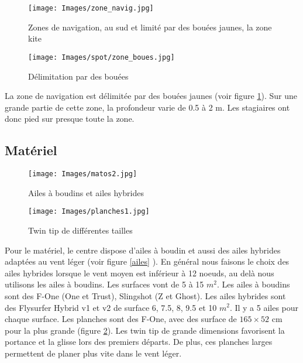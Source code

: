 \documentclass[11pt,a4paper]{report}
\begin{document}
%

\begin{figure}
\begin{minipage}{0.4\textwidth}
\texttt{[image: Images/zone\_navig.jpg]}
\caption{Zones de navigation, au sud et limité par des bouées jaunes,
la zone kite\label{zones_nav}} 
\end{minipage}
\hfill
\begin{minipage}{0.4\textwidth}
\texttt{[image: Images/spot/zone\_boues.jpg]}
\caption{Délimitation par des bouées\label{boue}}
\end{minipage}
\end{figure}
La zone de navigation est délimitée par des bouées jaunes (voir figure \ref{boue}). 
Sur une grande partie de cette zone, la profondeur varie de 0.5 à 2 m.
Les stagiaires ont donc pied sur presque toute la zone.

\FloatBarrier
\subsection{Matériel}
\begin{figure}[h]
\begin{minipage}{0.4\textwidth}
\texttt{[image: Images/matos2.jpg]} 
\caption{Ailes à boudins et ailes hybrides\label{ailes}}
\end{minipage}
\hfill
\begin{minipage}{0.4\textwidth}
\texttt{[image: Images/planches1.jpg]} 
\caption{Twin tip de différentes tailles\label{planches}}
\end{minipage}
\end{figure}
Pour le matériel, le centre dispose d'ailes à boudin et aussi 
des ailes hybrides adaptées au vent léger (voir figure \ref{ailes} ).
En général nous faisons
le choix des ailes hybrides lorsque le vent moyen est inférieur à
12 noeuds, au delà nous utilisons les ailes à boudins. Les
surfaces vont de 5 à 15 $m^2$. 
Les ailes à boudins sont des F-One (One et Trust), Slingshot (Z et Ghost).
Les ailes hybrides sont des Flysurfer Hybrid v1 et v2 de surface 6, 7.5, 8,
9.5 et 10 $m^2$. Il y a 5 ailes pour chaque surface.
Les planches sont des F-One, avec des surface de $165\times52$ cm
pour la plus grande (figure \ref{planches}).
Les twin tip de grande dimensions favorisent la portance et la glisse
lors des premiers départs. De plus, ces planches larges permettent
de planer plus vite dans le vent léger.
\end{document}
